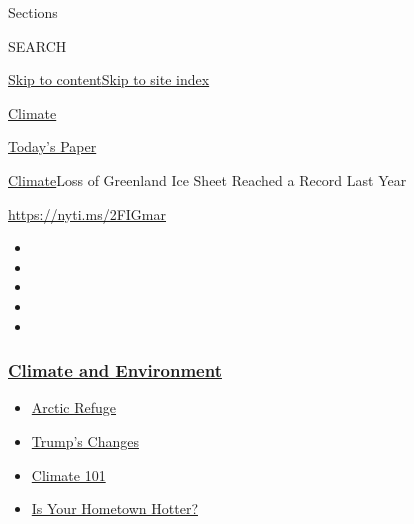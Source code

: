 Sections

SEARCH

\protect\hyperlink{site-content}{Skip to
content}\protect\hyperlink{site-index}{Skip to site index}

\href{https://www.nytimes3xbfgragh.onion/section/climate}{Climate}

\href{https://myaccount.nytimes3xbfgragh.onion/auth/login?response_type=cookie\&client_id=vi}{}

\href{https://www.nytimes3xbfgragh.onion/section/todayspaper}{Today's
Paper}

\href{/section/climate}{Climate}\textbar{}Loss of Greenland Ice Sheet
Reached a Record Last Year

\url{https://nyti.ms/2FIGmar}

\begin{itemize}
\item
\item
\item
\item
\item
\end{itemize}

\hypertarget{climate-and-environment}{%
\subsubsection{\texorpdfstring{\href{https://www.nytimes3xbfgragh.onion/section/climate?name=styln-climate\&region=TOP_BANNER\&variant=undefined\&block=storyline_menu_recirc\&action=click\&pgtype=Article\&impression_id=a753f690-e3a8-11ea-a20a-a7f4fdc1a30f}{Climate
and
Environment}}{Climate and Environment}}\label{climate-and-environment}}

\begin{itemize}
\tightlist
\item
  \href{https://www.nytimes3xbfgragh.onion/2020/08/17/climate/alaska-oil-drilling-anwr.html?name=styln-climate\&region=TOP_BANNER\&variant=undefined\&block=storyline_menu_recirc\&action=click\&pgtype=Article\&impression_id=a753f691-e3a8-11ea-a20a-a7f4fdc1a30f}{Arctic
  Refuge}
\item
  \href{https://www.nytimes3xbfgragh.onion/interactive/2020/climate/trump-environment-rollbacks.html?name=styln-climate\&region=TOP_BANNER\&variant=undefined\&block=storyline_menu_recirc\&action=click\&pgtype=Article\&impression_id=a753f692-e3a8-11ea-a20a-a7f4fdc1a30f}{Trump's
  Changes}
\item
  \href{https://www.nytimes3xbfgragh.onion/interactive/2020/04/19/climate/climate-crash-course-1.html?name=styln-climate\&region=TOP_BANNER\&variant=undefined\&block=storyline_menu_recirc\&action=click\&pgtype=Article\&impression_id=a7541da0-e3a8-11ea-a20a-a7f4fdc1a30f}{Climate
  101}
\item
  \href{https://www.nytimes3xbfgragh.onion/interactive/2018/08/30/climate/how-much-hotter-is-your-hometown.html?name=styln-climate\&region=TOP_BANNER\&variant=undefined\&block=storyline_menu_recirc\&action=click\&pgtype=Article\&impression_id=a7541da1-e3a8-11ea-a20a-a7f4fdc1a30f}{Is
  Your Hometown Hotter?}
\end{itemize}


